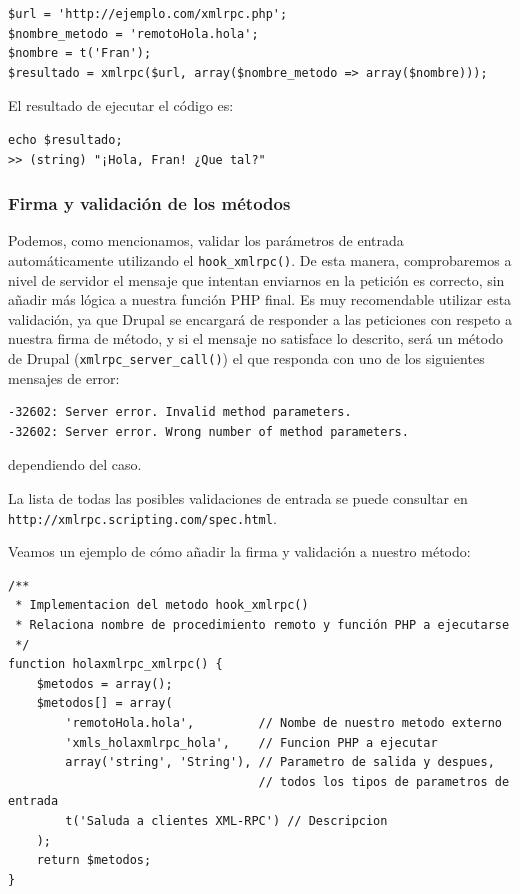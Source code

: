 \begin{verbatim}
$url = 'http://ejemplo.com/xmlrpc.php';
$nombre_metodo = 'remotoHola.hola';
$nombre = t('Fran');
$resultado = xmlrpc($url, array($nombre_metodo => array($nombre)));
\end{verbatim}

El resultado de ejecutar el código es:

\begin{verbatim}
echo $resultado;
>> (string) "¡Hola, Fran! ¿Que tal?"
\end{verbatim}

\subsubsection{\large{Firma y validación de los métodos}} 

Podemos, como mencionamos, validar los parámetros de entrada automáticamente utilizando el \verb|hook_xmlrpc()|. 
De esta manera, comprobaremos a nivel de servidor el mensaje que intentan enviarnos en la petición es correcto, sin 
añadir más lógica a nuestra función PHP final. Es muy recomendable utilizar esta validación, ya que Drupal 
se encargará de responder a las peticiones con respeto a nuestra firma de método, y si el mensaje no satisface 
lo descrito, será un método de Drupal (\verb|xmlrpc_server_call()|) el que responda con uno de los siguientes 
mensajes de error:
\begin{verbatim}
-32602: Server error. Invalid method parameters.
-32602: Server error. Wrong number of method parameters.
\end{verbatim}
dependiendo del caso.

La lista de todas las posibles validaciones de entrada se puede 
consultar en \verb|http://xmlrpc.scripting.com/spec.html|.

Veamos un ejemplo de cómo añadir la firma y validación a nuestro método:

\begin{verbatim}
/**
 * Implementacion del metodo hook_xmlrpc()
 * Relaciona nombre de procedimiento remoto y función PHP a ejecutarse
 */
function holaxmlrpc_xmlrpc() {
    $metodos = array();
    $metodos[] = array(
        'remotoHola.hola',         // Nombe de nuestro metodo externo
        'xmls_holaxmlrpc_hola',    // Funcion PHP a ejecutar
        array('string', 'String'), // Parametro de salida y despues, 
                                   // todos los tipos de parametros de entrada
        t('Saluda a clientes XML-RPC') // Descripcion
    );
    return $metodos;
}
\end{verbatim}

